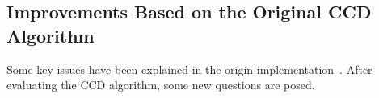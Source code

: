

\subsection{Improvements Based on the Original CCD Algorithm}
\label{sec:prob}
Some key issues have been explained in the origin
implementation~\cite{hanek2004contracting}.
After evaluating the CCD algorithm, some new questions are posed.

